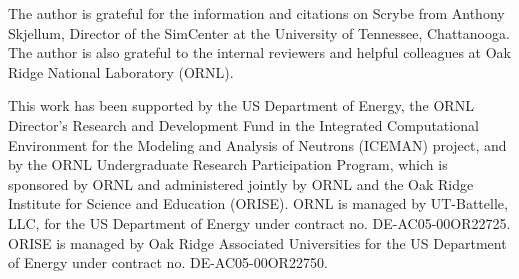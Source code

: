 
The author is grateful for the information and citations on Scrybe from Anthony
Skjellum, Director of the SimCenter at the University of Tennessee, Chattanooga.
The author is also grateful to the internal reviewers and helpful colleagues at
Oak Ridge National Laboratory (ORNL).

This work has been supported by the US Department of Energy, the ORNL Director's
Research and Development Fund in the Integrated Computational Environment for
the Modeling and Analysis of Neutrons (ICEMAN) project, and by the ORNL
Undergraduate Research Participation Program, which is sponsored by ORNL and
administered jointly by ORNL and the Oak Ridge Institute for Science and
Education (ORISE). ORNL is managed by UT-Battelle, LLC, for the US Department of
Energy under contract no. DE-AC05-00OR22725. ORISE is managed by Oak Ridge
Associated Universities for the US Department of Energy under contract no.
DE-AC05-00OR22750.